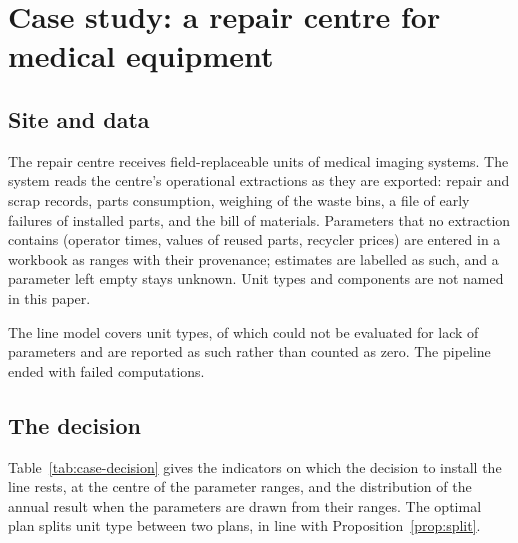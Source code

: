 \section{Case study: a repair centre for medical equipment}\label{sec:case}

\bandeau

\subsection{Site and data}

The repair centre receives field-replaceable units of medical imaging systems.  The system reads the centre's operational extractions as they are
exported: repair and scrap records, parts consumption, weighing of the waste bins, a file of early failures of
installed parts, and the bill of materials. Parameters that no extraction contains (operator times, values of
reused parts, recycler prices) are entered in a workbook as ranges with their provenance; estimates are labelled as
such, and a parameter left empty stays unknown. Unit types and components are not named in this paper.
\noteechelle

The line model covers \CasTypes{} unit types, of which \CasIncomplets{} could not be evaluated for lack of
parameters and are reported as such rather than counted as zero. The pipeline ended with \CasAnomalies{} failed
computations. 

\subsection{The decision}

Table~\ref{tab:case-decision} gives the indicators on which the decision to install the line rests, at the centre of
the parameter ranges, and the distribution of the annual result when the parameters are drawn from their ranges.
The optimal plan splits \CasPartages{} unit type between two plans, in line with Proposition~\ref{prop:split}.

